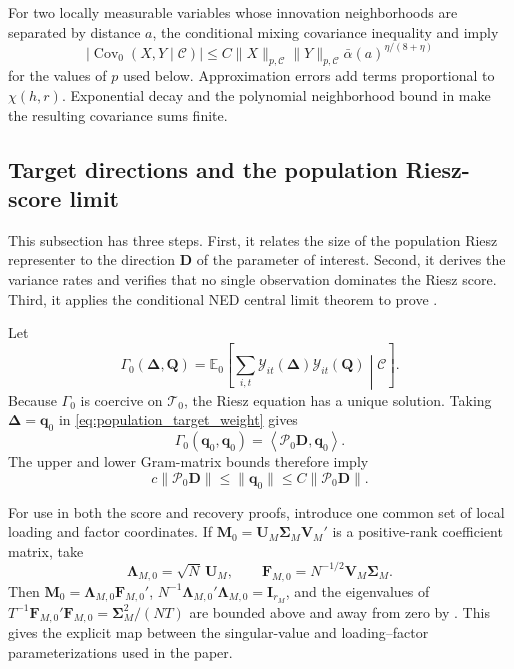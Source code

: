 \documentclass[11pt]{article}
\numberwithin{equation}{section}
\theoremstyle{remark}
\newcommand{\Ezero}{\mathbb E_0}
\newcommand{\ip}[2]{\left\langle #1,#2\right\rangle}
\newcommand{\bq}{\bm q}
\newcommand{\bD}{\bm D}
\newcommand{\bM}{\bm M}
\newcommand{\bQ}{\bm Q}
\newcommand{\bU}{\bm U}
\newcommand{\bV}{\bm V}
\newcommand{\bDelta}{\bm\Delta}
\newcommand{\bSigma}{\bm\Sigma}
\newcommand{\calP}{\mathcal P}
\newcommand{\calT}{\mathcal T}
\begin{document}
For two locally measurable variables whose innovation neighborhoods are separated by distance $a$, the conditional mixing covariance inequality and  imply
\begin{equation}
\label{eq:conditional_covariance_bound}
\left|
\operatorname{Cov}_0(X,Y\mid\mathscr C)
\right|
\le
C
\|X\|_{p,\mathscr C}
\|Y\|_{p,\mathscr C}
\bar\alpha(a)^{\eta/(8+\eta)}
\end{equation}
for the values of $p$ used below. Approximation errors add terms proportional to $\chi(h,r)$. Exponential decay and the polynomial neighborhood bound in  make the resulting covariance sums finite.

\subsection{Target directions and the population Riesz-score limit}
\label{app:population}

This subsection has three steps. First, it relates the size of the population Riesz representer to the direction $\bD$ of the parameter of interest. Second, it derives the variance rates and verifies that no single observation dominates the Riesz score. Third, it applies the conditional NED central limit theorem to prove .

Let
$$
\Gamma_0(\bDelta,\bQ)
=
\Ezero\!\left[
\sum_{i,t}
\mathcal Y_{it}(\bDelta)
\mathcal Y_{it}(\bQ)
\middle|\mathscr C
\right].
$$
Because $\Gamma_0$ is coercive on $\calT_0$, the Riesz equation has a unique solution. Taking $\bDelta=\bq_0$ in \eqref{eq:population_target_weight} gives
\begin{equation}
\label{eq:q_norm_identity}
\Gamma_0(\bq_0,\bq_0)
=
\ip{\calP_0\bD}{\bq_0}.
\end{equation}
The upper and lower Gram-matrix bounds therefore imply
\begin{equation}
\label{eq:q_target_norm_equivalence}
c\|\calP_0\bD\|
\le
\|\bq_0\|
\le
C\|\calP_0\bD\|.
\end{equation}

For use in both the score and recovery proofs, introduce one common set of local loading and factor coordinates. If $\bM_0=\bU_M\bSigma_M\bV_M'$ is a positive-rank coefficient matrix, take
$$
\bm\Lambda_{M,0}=\sqrt N\,\bU_M,
\qquad
\bm F_{M,0}=N^{-1/2}\bV_M\bSigma_M.
$$
Then $\bM_0=\bm\Lambda_{M,0}\bm F_{M,0}'$, $N^{-1}\bm\Lambda_{M,0}'\bm\Lambda_{M,0}=\bm I_{r_M}$, and the eigenvalues of $T^{-1}\bm F_{M,0}'\bm F_{M,0}=\bSigma_M^2/(NT)$ are bounded above and away from zero by . This gives the explicit map between the singular-value and loading--factor parameterizations used in the paper.
\end{document}
